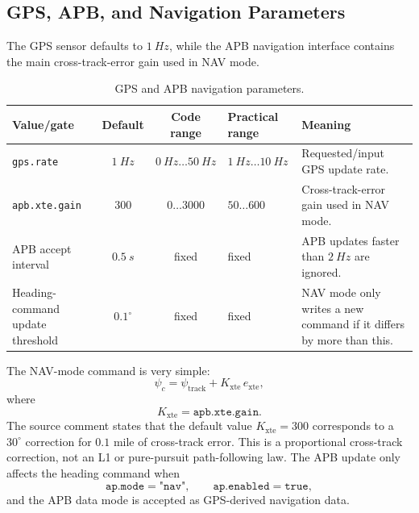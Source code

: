 \documentclass[11pt,twocolumn]{article}
\begin{document}
\subsection{GPS, APB, and Navigation Parameters}
The GPS sensor defaults to \(\SI{1}{Hz}\), while the APB navigation
interface contains the main cross-track-error gain used in NAV mode.
\begin{table}[t]
\centering
\caption{GPS and APB navigation parameters.}
\label{tab:pypilot-gps-apb-parameters}
\begin{tabularx}{\textwidth}{Z{0.23\textwidth}c c Z{0.16\textwidth}Y}
\toprule
Value/gate & Default & Code range & Practical range & Meaning \\
\midrule
\texttt{gps.rate} &
\(\SI{1}{Hz}\) &
\(\SI{0}{Hz}\ldots\SI{50}{Hz}\) &
\(\SI{1}{Hz}\ldots\SI{10}{Hz}\) &
Requested/input GPS update rate. \\
\texttt{apb.xte.gain} &
\num{300} &
\(\num{0}\ldots\num{3000}\) &
\(\num{50}\ldots\num{600}\) &
Cross-track-error gain used in NAV mode. \\
APB accept interval &
\(\SI{0.5}{s}\) &
fixed &
fixed &
APB updates faster than \(\SI{2}{Hz}\) are ignored. \\
Heading-command update threshold &
\(0.1^\circ\) &
fixed &
fixed &
NAV mode only writes a new command if it differs by more than this. \\
\bottomrule
\end{tabularx}
\end{table}
The NAV-mode command is very simple:
\[
\psi_c
=
\psi_{\mathrm{track}}
+
K_{\mathrm{xte}}\,e_{\mathrm{xte}},
\]
where
\[
K_{\mathrm{xte}} = \texttt{apb.xte.gain}.
\]
The source comment states that the default value \(K_{\mathrm{xte}}=300\)
corresponds to a \(30^\circ\) correction for \(0.1\) mile of cross-track
error.  This is a proportional cross-track correction, not an L1 or
pure-pursuit path-following law.
The APB update only affects the heading command when
\[
\texttt{ap.mode}=\texttt{"nav"},
\qquad
\texttt{ap.enabled}=\texttt{true},
\]
and the APB data mode is accepted as GPS-derived navigation data.
\end{document}
